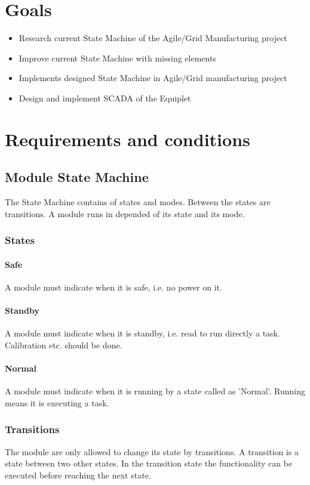 \section{Goals}
\begin{itemize}
\item Research current State Machine of the Agile/Grid Manufacturing project
\item Improve current State Machine with missing elements
\item Implements designed State Machine in Agile/Grid manufacturing project 
\item Design and implement SCADA of the Equiplet
\end{itemize}

\newpage
\section{Requirements and conditions}
\subsection{Module State Machine}
The State Machine contains of states and modes. Between the states are transitions. A module runs in depended of its state and its mode.

\subsubsection{States}
\paragraph{Safe}A module must indicate when it is safe, i.e. no power on it.
\paragraph{Standby}A module must indicate when it is standby, i.e. read to run directly a task. Calibration etc. should be done.
\paragraph{Normal}A module must indicate when it is running by a state called as 'Normal'. Running means it is executing a task.

\subsubsection{Transitions}
The module are only allowed to change its state by transitions. A transition is a state between two other states. In the transition state the functionality can be executed before reaching the next state.
